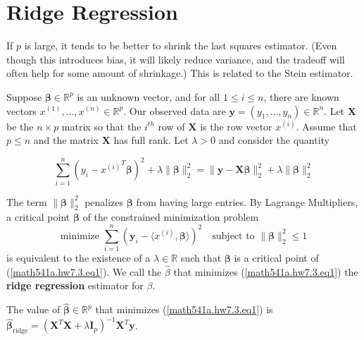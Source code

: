\section{Ridge Regression}

If \(p\) is large, it tends to be better to shrink the last squares estimator. (Even though this introduces bias, it will likely reduce variance, and the tradeoff will often help for some amount of shrinkage.) This is related to the Stein estimator.

Suppose $\boldsymbol{\beta}\in\mathbb{R}^{p}$ is an unknown vector, and for all $1\leq i\leq n$, there are known vectors $x^{(1)},\ldots,x^{(n)}\in\mathbb{R}^{p}$.  Our observed data are $\boldsymbol{y} = (y_{1},\ldots,y_{n})\in\mathbb{R}^n$. Let $\boldsymbol{X}$ be the $n\times p$ matrix so that the $i^{th}$ row of $\boldsymbol{X}$ is the row vector $x^{(i)}$.  Assume that $p\leq n$ and the matrix $\boldsymbol{X}$ has full rank. Let $\lambda>0$ and consider the quantity

\begin{equation}\label{math541a.hw7.3.eq1}
 \sum_{i=1}^{n}\left(y_{i}-{x^{(i)}}^T\boldsymbol{\beta} \right )^{2}+\lambda\lVert \boldsymbol{\beta}\rVert_2^{2} = \lVert \boldsymbol{y} - \boldsymbol{X} \boldsymbol{\beta} \rVert_2^2 +\lambda\lVert \boldsymbol{\beta}\rVert_2^{2}
\end{equation}

 The term $\lVert \boldsymbol{\beta} \rVert_2^{2}$ penalizes $\boldsymbol{\beta}$ from having large entries.  By Lagrange Multipliers, a critical point $\boldsymbol{\beta}$ of the constrained minimization problem
$$\mbox{minimize}\,\,\sum_{i=1}^{n}(\boldsymbol{y}_{i}-\langle x^{(i)},\boldsymbol{\beta}\rangle)^{2}\quad \mbox{subject}\,\,\mbox{to}\,\,\lVert \boldsymbol{\beta}\rVert_2^{2}\leq 1$$
is equivalent to the existence of a $\lambda\in\mathbb{R}$ such that $\boldsymbol{\beta}$ is a critical point of (\ref{math541a.hw7.3.eq1}). We call the \(\hat{\beta}\) that minimizes (\ref{math541a.hw7.3.eq1}) the \textbf{ridge regression} estimator for \(\beta\).

\begin{proposition}

The value of $\hat{\boldsymbol{\beta}}\in\mathbb{R}^{p}$ that minimizes (\ref{math541a.hw7.3.eq1}) is \(\hat{\boldsymbol{\beta}}_{\text{ridge}} = (\boldsymbol{X}^T\boldsymbol{X} + \lambda \boldsymbol{I}_p)^{-1}\boldsymbol{X}^T \boldsymbol{y}\).

\end{proposition}

